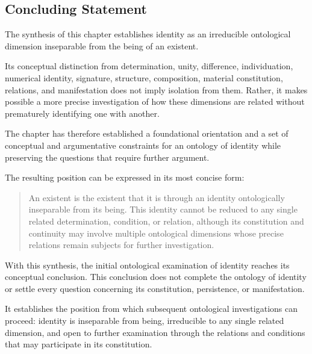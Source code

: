 \subsection{Concluding Statement}

The synthesis of this chapter establishes
identity as an irreducible ontological dimension
inseparable from the being of an existent.

Its conceptual distinction from determination,
unity, difference, individuation, numerical
identity, signature, structure, composition,
material constitution, relations, and
manifestation does not imply isolation from
them. Rather, it makes possible a more precise
investigation of how these dimensions are
related without prematurely identifying one
with another.

The chapter has therefore established a
foundational orientation and a set of
conceptual and argumentative constraints
for an ontology of identity while preserving
the questions that require further argument.

The resulting position can be expressed
in its most concise form:

\begin{quote}
An existent is the existent that it is through
an identity ontologically inseparable from
its being. This identity cannot be reduced
to any single related determination, condition,
or relation, although its constitution and
continuity may involve multiple ontological
dimensions whose precise relations remain
subjects for further investigation.
\end{quote}

With this synthesis, the initial ontological
examination of identity reaches its conceptual
conclusion. This conclusion does not complete
the ontology of identity or settle every
question concerning its constitution,
persistence, or manifestation.

It establishes the position from which
subsequent ontological investigations can
proceed: identity is inseparable from being,
irreducible to any single related dimension,
and open to further examination through the
relations and conditions that may participate
in its constitution.

